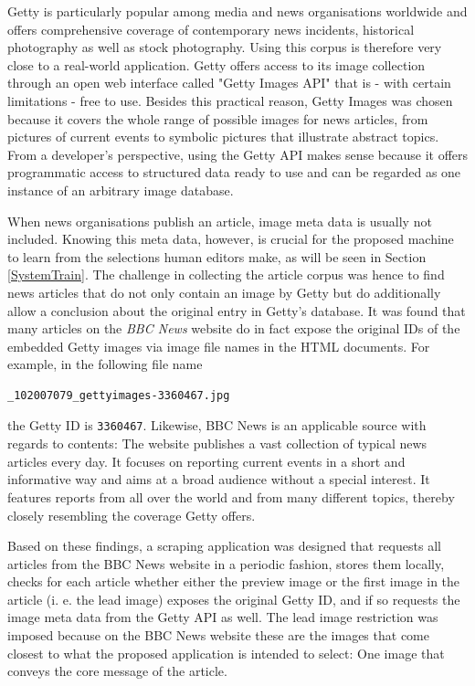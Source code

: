 \documentclass[11pt,a4paper,twoside]{article}
\begin{document}
Getty is particularly popular among media and news organisations worldwide and offers comprehensive coverage of contemporary news incidents, historical photography as well as stock photography. Using this corpus is therefore very close to a real-world application. Getty offers access to its image collection through an open web interface called "Getty Images API" \cite{GettyImagesAPIOverview} that is - with certain limitations - free to use. Besides this practical reason, Getty Images was chosen because it covers the whole range of possible images for news articles, from pictures of current events to symbolic pictures that illustrate abstract topics. From a developer's perspective, using the Getty API makes sense because it offers programmatic access to structured data ready to use and can be regarded as one instance of an arbitrary image database.

When news organisations publish an article, image meta data is usually not included. Knowing this meta data, however, is crucial for the proposed machine to learn from the selections human editors make, as will be seen in Section \ref{SystemTrain}. The challenge in collecting the article corpus was hence to find news articles that do not only contain an image by Getty but do additionally allow a conclusion about the original entry in Getty's database. It was found that many articles on the \emph{BBC News} website \cite{BBCBBCNews} do in fact expose the original IDs of the embedded Getty images via image file names in the HTML documents. For example, in the following file name

\begin{lstlisting}
_102007079_gettyimages-3360467.jpg
\end{lstlisting}

\noindent the Getty ID is \lstinline{3360467}. Likewise, BBC News is an applicable source with regards to contents: The website publishes a vast collection of typical news articles every day. It focuses on reporting current events in a short and informative way and aims at a broad audience without a special interest. It features reports from all over the world and from many different topics, thereby closely resembling the coverage Getty offers.

Based on these findings, a scraping application was designed that requests all articles from the BBC News website in a periodic fashion, stores them locally, checks for each article whether either the preview image or the first image in the article (i. e.  the lead image) exposes the original Getty ID, and if so requests the image meta data from the Getty API as well. The lead image restriction was imposed because on the BBC News website these are the images that come closest to what the proposed application is intended to select: One image that conveys the core message of the article.
\end{document}
